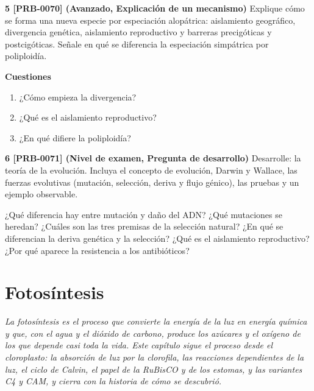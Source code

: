 \documentclass{book}
\begin{document}
\begin{tcolorbox}[title={Ejercicios}, studiumworked, breakable]
\noindent\textbf{5 [PRB-0070] (Avanzado, Explicación de un mecanismo)}
Explique cómo se forma una nueva especie por especiación alopátrica: aislamiento geográfico, divergencia genética, aislamiento reproductivo y barreras precigóticas y postcigóticas. Señale en qué se diferencia la especiación simpátrica por poliploidía.


\noindent\textbf{Cuestiones}
\begin{enumerate}
\item ¿Cómo empieza la divergencia?
\item ¿Qué es el aislamiento reproductivo?
\item ¿En qué difiere la poliploidía?
\end{enumerate}

\noindent\textbf{6 [PRB-0071] (Nivel de examen, Pregunta de desarrollo)}
Desarrolle: la teoría de la evolución. Incluya el concepto de evolución, Darwin y Wallace, las fuerzas evolutivas (mutación, selección, deriva y flujo génico), las pruebas y un ejemplo observable.

\end{tcolorbox}

\begin{tcolorbox}[title={Autoficha}, studiumcheck, breakable]

¿Qué diferencia hay entre mutación y daño del ADN? ¿Qué mutaciones se heredan? ¿Cuáles son las tres premisas de la selección natural? ¿En qué se diferencian la deriva genética y la selección? ¿Qué es el aislamiento reproductivo? ¿Por qué aparece la resistencia a los antibióticos?

\end{tcolorbox}

\chapter{Fotosíntesis}
\label{chap:bio-10}

\noindent\textit{La fotosíntesis es el proceso que convierte la energía de la luz en energía química y que, con el agua y el dióxido de carbono, produce los azúcares y el oxígeno de los que depende casi toda la vida. Este capítulo sigue el proceso desde el cloroplasto: la absorción de luz por la clorofila, las reacciones dependientes de la luz, el ciclo de Calvin, el papel de la RuBisCO y de los estomas, y las variantes C4 y CAM, y cierra con la historia de cómo se descubrió.}
\end{document}
